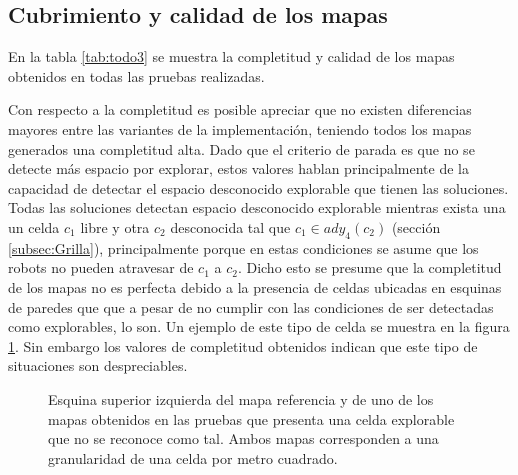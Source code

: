 \subsection{Cubrimiento y calidad de los mapas} \label{sec:exp:cubcal}



En la tabla \ref{tab:todo3} se muestra la completitud y calidad de los mapas
obtenidos en todas las pruebas realizadas. 

Con respecto a la completitud es posible apreciar que no existen diferencias
mayores entre las variantes de la implementación, teniendo todos los mapas
generados una completitud alta. Dado que el criterio de parada es que no se
detecte más espacio por explorar, estos valores hablan principalmente de la
capacidad de detectar el espacio desconocido explorable que tienen las
soluciones. Todas las soluciones detectan espacio desconocido explorable
mientras exista una un celda $c_1$ libre y otra $c_2$ desconocida tal que $c_1
\in ady_4(c_2)$ (sección \ref{subsec:Grilla}), principalmente porque en estas
condiciones se asume que los robots no pueden atravesar de $c_1$ a $c_2$. Dicho
esto se presume que la completitud de los mapas no es perfecta debido a la
presencia de celdas ubicadas en esquinas de paredes que que a pesar de no
cumplir con las condiciones de ser detectadas como explorables, lo son. Un
ejemplo de este tipo de celda se muestra en la figura \ref{fig:faltaCub}. Sin
embargo los valores de completitud obtenidos indican que este tipo de
situaciones son despreciables.

\begin{figure}[H]
  \centerfloat

  \qquad

  \caption{Esquina superior izquierda del mapa referencia y de uno de los mapas
  obtenidos en las pruebas que presenta una celda explorable que no se reconoce
como tal. Ambos mapas corresponden a una granularidad de una celda por metro cuadrado.}\label{fig:faltaCub}

\end{figure}

